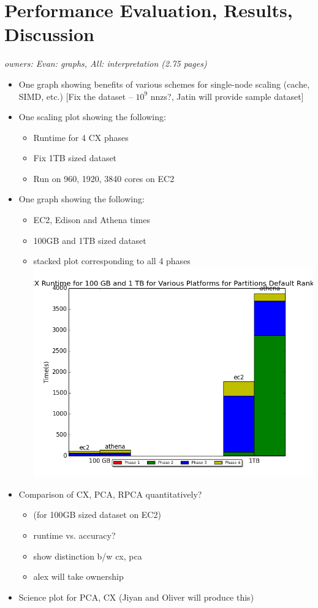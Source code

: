 \usepackage{graphicx}
\graphicspath{ {images/} }
\section{Performance Evaluation, Results, Discussion}

\textit{owners: Evan: graphs, All: interpretation (2.75 pages)}
\begin{itemize}
  \item One graph showing benefits of various schemes for single-node scaling (cache, SIMD, etc.) [Fix the dataset -- $10^9$ nnzs?, Jatin will provide sample dataset]
  \item One scaling plot showing the following:
  \begin{itemize}
    \item Runtime for 4 CX phases
    \item Fix 1TB sized dataset
    \item Run on 960, 1920, 3840 cores on EC2  
  \end{itemize}

  \item One graph showing the following:
  \begin{itemize}
    \item EC2, Edison and Athena times
    \item 100GB and 1TB sized dataset
    \item stacked plot corresponding to all 4 phases
    \includegraphics{dataset_scale_graphs}
  \end{itemize}
 \item Comparison of CX, PCA, RPCA quantitatively? 
  \begin{itemize}
    \item (for 100GB sized dataset on EC2)
    \item runtime vs. accuracy?
    \item show distinction b/w cx, pca
    \item alex will take ownership
  \end{itemize}

 \item Science plot for PCA, CX (Jiyan and Oliver will produce this)
\end{itemize}
